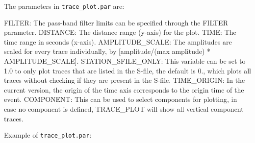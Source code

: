 The parameters in \texttt{trace\_plot.par} are: 

FILTER: The pass-band filter limits can be specified through the FILTER parameter.\newline
DISTANCE: The distance range (y-axis) for the plot.\newline
TIME: The time range in seconds (x-axis).\newline
AMPLITUDE\_SCALE: The amplitudes are scaled for every trace individually, by  [amplitude/(max 
amplitude) * AMPLITUDE\_SCALE]. \newline
STATION\_SFILE\_ONLY: This variable can be set to 1.0 to only plot 
traces that are listed in the S-file, the default is 0., which plots 
all traces without checking if they are present in the S-file. \newline
TIME\_ORIGIN: In the current version, the origin of the time axis 
corresponds to the origin time of the event. \newline
COMPONENT: This can be used to select components for plotting, in case no component is defined, TRACE\_PLOT will show all vertical component traces. 

Example of \texttt{trace\_plot.par}: 



